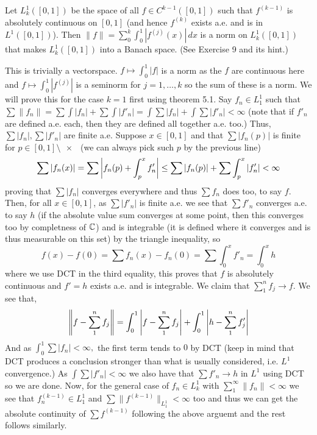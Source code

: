\documentclass[12pt,a4paper]{article}
\begin{document}
\begin{problem}\label{prob:5-10}
Let $L_k^1([0,1])$ be the space of all $f \in C^{k-1}([0,1])$ such that $f^{(k-1)}$ is absolutely continuous on $[0,1]$ (and hence $f^{(k)}$ exists a.e. and is in $L^1([0,1])$). Then $\|f\| = \sum_{0}^{k} \int_0^1 |f^{(j)}(x)|\,dx$ is a norm on $L_k^1([0,1])$ that makes $L_k^1([0,1])$ into a Banach space. (See Exercise 9 and its hint.)
\end{problem}
\begin{solution}
    This is trivially a vectorspace. 
    $f\mapsto\int_0^1|f|$ is a norm as the $f$ are continuous here and $f\mapsto\int_0^1|f^{(j)}|$ is a seminorm for $j=1,\ldots,k$ so the sum of these is a norm.     
    We will prove this for the case $k=1$ first using theorem 5.1. 
    Say $f_n\in L^1_1$ such that $\sum \left\|f_n\right\|=\sum\int|f_n|+\sum\int|f'_n|=\int\sum|f_n|+\int\sum|f'_n|<\infty$ (note that if $f'_n$ are defined a.e. each, then they are defined all together a.e. too.) 
    Thus, $\sum|f_n|,\sum|f'_n|$ are finite a.e. 
    Suppose $x\in [0,1]$ and that $\sum|f_n(p)|$ is finite for $p\in[0,1]\setminus \qty{x}$ (we can always pick such $p$ by the previous line)  
    \[
        \sum|f_n(x)|=\sum\qty|f_n(p)+\int_p^xf'_n|\leq\sum|f_n(p)|+\sum\int_p^x|f_n'|<\infty
    \]
    proving that $\sum|f_n|$ converges everywhere and thus $\sum f_n$ does too, to say $f$. 
    Then, for all $x\in[0,1]$, as $\sum |f'_n|$ is finite a.e. we see that $\sum f'_n$ converges a.e. to say $h$ (if the absolute value sum converges at some point, then this converges too by completness of $\mathbb{C}$) and is integrable (it is defined where it converges and is thus measurable on this set) by the triangle inequality, so
    \[
        f(x)-f(0)=\sum f_n(x)-f_n(0)=\sum\int_0^x f'_n=\int_0^xh
    \]
    where we use DCT in the third equality, this proves that $f$ is absolutely continuous and $f'=h$ exists a.e. and is integrable.  
    We claim that $\sum_1^n f_j\to f$. 
    We see that, 
    \[
        \left\|f-\sum_1^nf_j\right\|=\int_0^1\qty|f-\sum_1^nf_j|+\int_0^1\qty|h-\sum_1^nf_j'|
    \]
    And as $\int_0^1\sum|f_n|<\infty,$ the first term tends to $0$ by DCT (keep in mind that DCT produces a conclusion stronger than what is usually considered, i.e. $L^1$ convergence.) 
    As $\int\sum|f'_n|<\infty$ we also have that $\sum f'_n\to h$ in $L^1$ using DCT so we are done. 
    Now, for the general case of $f_n\in L_k^1$ with $\sum_1^\infty \left\|f_n\right\|<\infty$ we see that $f_n^{(k-1)}\in L_1^1$ and $\sum\|f^{(k-1)}\|_{L_1^1}<\infty$ too and thus we can get the absolute continuity of $\sum f^{(k-1)}$ following the above arguemt and the rest follows similarly. 
\end{solution}
\end{document}
